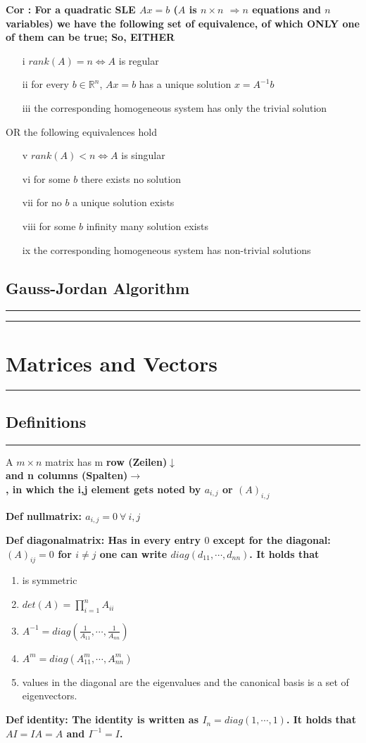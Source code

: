 \documentclass[7pt,landscape, margin = 0.1mm]{article}
\newcommand{\titellinie}{\rule{1.\linewidth}{0.75pt}}
\newcommand*{\mysection}[2][black]{\vskip 0pt \titellinie\vspace{-20pt}\section{#2}\vspace{-14pt}\titellinie \colorlet{chaptercolor}{#1}}
\newcommand*{\mysubsection}[1]{\vspace{-2mm}\color{chaptercolor}\subsection{ #1 }
\vspace{-1mm}\hrule\vspace{1.5mm}\color{black}
\vspace{2mm}}
\newcommand{\COL}[1]{ \color{chaptercolor} \bf{#1}\color{black}     \\}
\newcommand{\DEF}[2]{\color{chaptercolor}\bf{Def #1}:\color{black}    \hspace{0.2cm} #2}
\newcommand{\COR}[2]{\color{chaptercolor}\bf{Cor #1}:\color{black}    \hspace{0.2cm} #2}
\begin{document}
\begin{multicols}{4}
\begin{flushleft}
\COR{}{For a quadratic SLE $Ax=b$ ($A$ is $n \times n$ $\Rightarrow n$ equations and $n$ variables) we have the following set of equivalence, of which ONLY one of them can be true; So, EITHER
\begin{itemize}
 \item[i] $rank(A) = n \Leftrightarrow A$ is regular
 \item[ii] for every $b \in \mathbb{R}^n$, $Ax=b$ has a unique solution $x=A^{-1}b$
 \item[iii] the corresponding homogeneous system has only the trivial solution 
 \end{itemize}
 OR the following equivalences hold
\begin{itemize}
 \item[v] $rank(A) < n \Leftrightarrow A$ is singular
 \item[vi] for some $b$ there exists no solution
 \item[vii] for no $b$ a unique solution exists
 \item[viii] for some $b$ infinity many solution exists
 \item[ix] the corresponding homogeneous system has non-trivial solutions
\end{itemize}}

\mysubsection{Gauss-Jordan Algorithm}

\mysection[Dandelion]{\centering Matrices and Vectors}
\mysubsection{Definitions}
A $m \times n  $ matrix has m \COL{row (Zeilen)$\downarrow$}  and n \COL{columns (Spalten)$\to$}, in which the i,j element gets noted by $a_{i,j}$ or $(A)_{i,j}$

\DEF{nullmatrix}{$a_{i,j}=0\ \forall\ i,j$}

\DEF{diagonalmatrix}{Has in every entry $0$ except for the diagonal: $(A)_{ij} = 0$ for $i \neq j $ one can write $diag(d_{11}, \cdots , d_{nn})$. It holds that
\begin{enumerate}[nolistsep]
    \item is symmetric
    \item $det(A)=\prod_{i=1}^n A_{ii}$
    \item $A^{-1}=diag(\frac{1}{A_{11}}, \cdots, \frac{1}{A_{nn}})$
    \item $A^m=diag(A_{11}^m, \cdots, A_{nn}^m)$
    \item values in the diagonal are the eigenvalues and the canonical basis is a set of eigenvectors.
\end{enumerate}

\DEF{identity}{The identity is written as $I_n = diag(1 , \cdots , 1)$. It holds that $AI = IA = A$ and $I^{-1}=I$.}

}
\end{flushleft}
\end{multicols}
\end{document}
